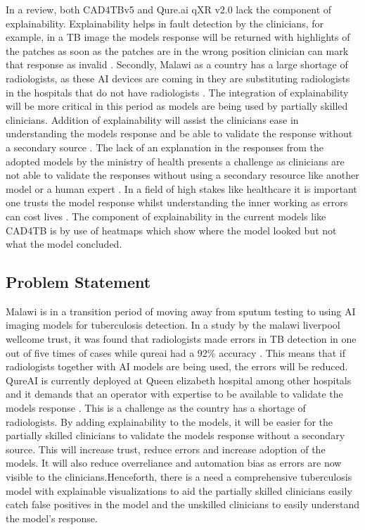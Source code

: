 \documentclass[12pt,a4paper]{article}
\begin{document}
In a review, both CAD4TBv5 and Qure.ai qXR v2.0 lack the component of explainability. Explainability helps in fault detection by the clinicians, for example, in a TB image the models response will be returned with highlights of the patches as soon as the patches are in the wrong position clinician can mark that response as invalid \citep{Mller2023}. 
Secondly, Malawi as a country has a large shortage of radiologists, as these AI devices are coming in they are substituting radiologists in the hospitals that do not have radiologists \citep{Chinkhumba2025}. The integration of explainability will be more critical in this period as models are being used by partially skilled clinicians. Addition of explainability will assist the clinicians ease in understanding the models response and be able to validate the response without a secondary source \citep{Alharthi2024}.
The lack of an explanation in the responses from the adopted models by the ministry of health presents a challenge as clinicians are not able to validate the responses without using a secondary resource like another model or a human expert \citep{Delft-Imaging2023}. In a field of high stakes like healthcare it is important one trusts the model response whilst understanding the inner working as errors can cost lives \citep{Mller2023}. The component of explainability in the current models like CAD4TB is by use of heatmaps which show where the model looked but not what the model concluded.

\subsection{Problem Statement}
Malawi is in a transition period of moving away from sputum testing to using AI imaging models for tuberculosis detection. In a study by the malawi liverpool wellcome trust, it was found that radiologists made errors in TB detection in one out of five times of cases while qureai had a 92\% accuracy \citep{Twabi2021}. This means that if radiologists together with AI models are being used, the errors will be reduced. QureAI is currently deployed at Queen elizabeth hospital among other hospitals and it demands that an operator with expertise to be available to validate the models response \citep{Delft-Imaging2023}. This is a challenge as the country has a shortage of radiologists. By adding explainability to the models, it will be easier for the partially skilled clinicians to validate the models response without a secondary source. This will increase trust, reduce errors and increase adoption of the models. It will also reduce overreliance and automation bias as errors are now visible to the clinicians.Henceforth, there is a need a comprehensive tuberculosis model with explainable visualizations to aid the partially skilled clinicians easily catch false positives in the model and the unskilled clinicians to easily understand the model's response. 
\end{document}
